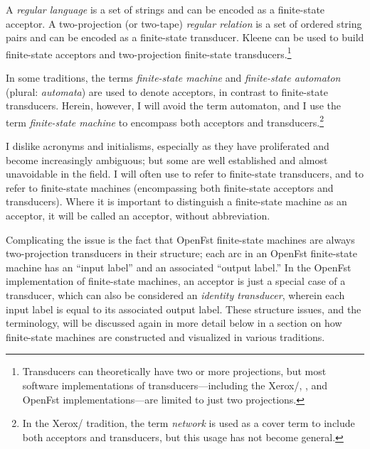 A \emph{regular language} is a set of strings and can be encoded as a finite-state acceptor.  A
two-projection (or two-tape) \emph{regular relation} is a set of ordered string pairs and can be
encoded as a finite-state transducer.  Kleene can be used to build finite-state acceptors
and two-projection finite-state transducers.\footnote{Transducers can theoretically have
two or more projections, but most software implementations of transducers---including the
Xerox/, ,  and OpenFst implementations---are limited to
just two projections.}

In some traditions, the terms \emph{finite-state machine} and \emph{finite-state automaton}
(plural: \emph{automata}) are used to
denote acceptors, in contrast to finite-state transducers.  Herein, however, I will avoid the
term automaton, and I use the term \emph{finite-state machine} to encompass both
acceptors and transducers.\footnote{In the Xerox/ tradition, the term
\emph{network} is used as a cover term to include both acceptors and transducers, but this
usage has not become general.}

I dislike acronyms and initialisms, especially as they have proliferated and become
increasingly
ambiguous; but some are well established and almost unavoidable in the field.  I will often use
\emph{\fst{}} to refer to finite-state transducers, and \emph{\fsm{}} to refer to finite-state machines
(encompassing both finite-state acceptors and transducers).
Where it is important to distinguish a finite-state machine as an acceptor, it will be
called an acceptor, without abbreviation.

Complicating the issue is the fact that OpenFst finite-state machines are always two-projection
transducers in their structure; each arc in an OpenFst finite-state machine has an ``input
label'' and an associated ``output label.''  In the OpenFst
implementation of finite-state machines, an acceptor is just a special
case of a transducer, which can also be considered an \emph{identity transducer}, wherein each input label is equal to
its associated output label.  These structure issues, and the terminology, will be
discussed again in more detail below in a section on how finite-state machines are
constructed and visualized in various traditions.


